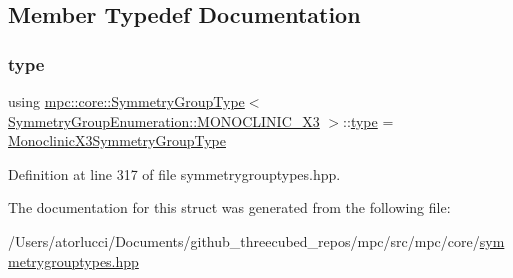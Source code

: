 \subsection{Member Typedef Documentation}
\mbox{\label{structmpc_1_1core_1_1_symmetry_group_type_3_01_symmetry_group_enumeration_1_1_m_o_n_o_c_l_i_n_i_c___x3_01_4_a80413b16e88e14e73bc364495cf50e78}} 
\subsubsection{\texorpdfstring{type}{type}}
{\footnotesize\ttfamily using \mbox{\hyperlink{structmpc_1_1core_1_1_symmetry_group_type}{mpc\+::core\+::\+Symmetry\+Group\+Type}}$<$ \mbox{\hyperlink{namespacempc_1_1core_a9d979684062547055a0ef5c13077bad8ab31f5171fdded777eb3112da45967b57}{Symmetry\+Group\+Enumeration\+::\+M\+O\+N\+O\+C\+L\+I\+N\+I\+C\+\_\+\+X3}} $>$\+::\mbox{\hyperlink{structmpc_1_1core_1_1_symmetry_group_type_3_01_symmetry_group_enumeration_1_1_m_o_n_o_c_l_i_n_i_c___x3_01_4_a80413b16e88e14e73bc364495cf50e78}{type}} =  \mbox{\hyperlink{structmpc_1_1core_1_1_monoclinic_x3_symmetry_group_type}{Monoclinic\+X3\+Symmetry\+Group\+Type}}}



Definition at line 317 of file symmetrygrouptypes.\+hpp.



The documentation for this struct was generated from the following file\+:\begin{DoxyCompactItemize}
\item 
/\+Users/atorlucci/\+Documents/github\+\_\+threecubed\+\_\+repos/mpc/src/mpc/core/\mbox{\hyperlink{symmetrygrouptypes_8hpp}{symmetrygrouptypes.\+hpp}}\end{DoxyCompactItemize}
